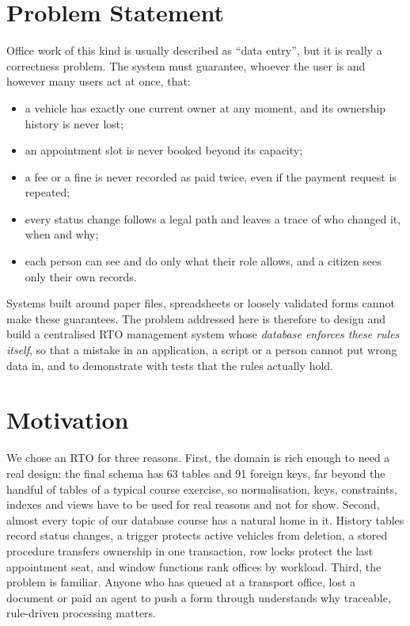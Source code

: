 \section{Problem Statement}
Office work of this kind is usually described as ``data entry'', but it is really a
correctness problem. The system must guarantee, whoever the user is and however many
users act at once, that:
\begin{itemize}
\item a vehicle has exactly one current owner at any moment, and its ownership history is never lost;
\item an appointment slot is never booked beyond its capacity;
\item a fee or a fine is never recorded as paid twice, even if the payment request is repeated;
\item every status change follows a legal path and leaves a trace of who changed it, when and why;
\item each person can see and do only what their role allows, and a citizen sees only their own records.
\end{itemize}
Systems built around paper files, spreadsheets or loosely validated forms cannot make
these guarantees. The problem addressed here is therefore to design and build a
centralised RTO management system whose \emph{database enforces these rules itself},
so that a mistake in an application, a script or a person cannot put wrong data in,
and to demonstrate with tests that the rules actually hold.

\section{Motivation}
We chose an RTO for three reasons. First, the domain is rich enough to need a
real design: the final schema has 63 tables and 91 foreign keys, far beyond the
handful of tables of a typical course exercise, so normalisation, keys, constraints,
indexes and views have to be used for real reasons and not for show. Second, almost
every topic of our database course has a natural home in it. History tables record
status changes, a trigger protects active vehicles from deletion, a stored procedure
transfers ownership in one transaction, row locks protect the last appointment seat,
and window functions rank offices by workload. Third, the problem is familiar. Anyone
who has queued at a transport office, lost a document or paid an agent to push a
form through understands why traceable, rule-driven processing matters.

